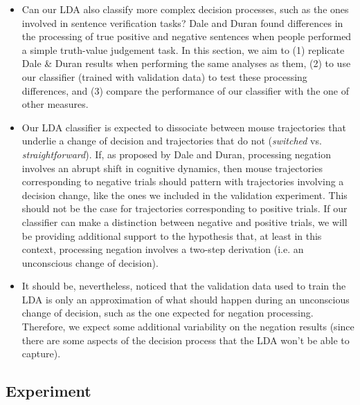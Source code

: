 \documentclass{article}
\begin{document}
\begin{itemize}

\item Can our LDA also classify more complex decision processes, such as the ones involved in sentence verification tasks?
Dale and Duran found differences in the processing of true positive and negative sentences when people performed a simple truth-value judgement task. In this section, we aim to (1) replicate Dale \& Duran results when performing the same analyses as them, (2) to use our classifier (trained with validation data) to test these processing differences, and (3) compare the performance of our classifier with the one of other measures. 

\item Our LDA classifier is expected to dissociate between mouse trajectories that underlie a change of decision and trajectories that do not (\textit{switched} vs. \textit{straightforward}). 
If, as proposed by Dale and Duran, processing negation involves an abrupt shift in cognitive dynamics, then mouse trajectories corresponding to negative trials should pattern with trajectories involving a decision change, like the ones we included in the validation experiment. This should not be the case for trajectories corresponding to positive trials. 
If our classifier can make a distinction between negative and positive trials, we will be providing additional support to the hypothesis that, at least in this context, processing negation involves a two-step derivation (i.e. an unconscious change of decision). 

\item It should be, nevertheless, noticed that the validation data used to train the LDA is only an approximation of what should happen during an unconscious change of decision, such as the one expected for negation processing. Therefore, we expect some additional variability on the negation results (since there are some aspects of the decision process that the LDA won't be able to capture). 


\end{itemize}

\subsection{Experiment}
\end{document}
